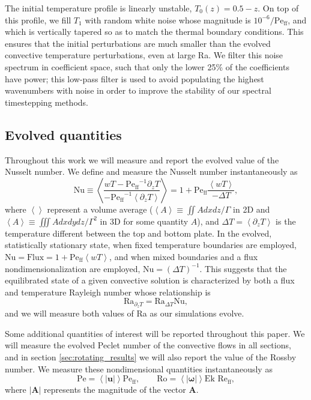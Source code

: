 \documentclass[aps, pre, onecolumn, nofootinbib, notitlepage, groupedaddress, amsfonts, amssymb, amsmath, longbibliography]{revtex4-1}
\newcommand{\angles}[1]{\ensuremath{\left\langle #1 \right\rangle}}
\newcommand{\Reff}{\ensuremath{\text{Re}_{\text{ff}}}}
\newcommand{\Peff}{\ensuremath{\text{Pe}_{\text{ff}}}}
\begin{document}
The initial temperature profile is linearly unstable, $T_0(z) = 0.5 - z$. 
On top of this profile, we fill $T_1$ with random white noise whose magnitude is $10^{-6}/\Peff$, and which is vertically tapered so as to match the thermal boundary conditions.
This ensures that the initial perturbations are much smaller than the evolved convective temperature perturbations, even at large Ra.
We filter this noise spectrum in coefficient space, 
such that only the lower 25\% of the coefficients
have power; this low-pass filter is used to avoid populating the
highest wavenumbers with noise in order to improve the stability of our
spectral timestepping methods.


\subsection{Evolved quantities}
\label{sec:ra_nu_relations}
Throughout this work we will measure and report the evolved value of the Nusselt number.
We define and measure the Nusselt number instantaneously as
\begin{equation}
\text{Nu} \equiv \angles{\frac{w T - \Peff^{-1} \partial_z T}{-\Peff^{-1} \angles{\partial_z T}}}
= 1 + \Peff\frac{\angles{w T}}{-\Delta T},
\end{equation}
where $\angles{}$ represent a volume average ($\angles{A} \equiv \iint A dx dz / \Gamma$ in 2D and $\angles{A} \equiv \iiint A dx dy dz / \Gamma^2$ in 3D for some quantity $A$), and $\Delta T = \angles{\partial_z T}$ is the temperature different between the top and bottom plate.
In the evolved, statistically stationary state, when fixed temperature boundaries are employed, $\text{Nu} = \text{Flux} = 1 + \Peff\angles{wT}$, and when mixed boundaries and a flux nondimensionalization are employed, $\text{Nu} = (\Delta T)^{-1}$.
This suggests that the equilibrated state of a given convective solution is characterized by both a flux and temperature Rayleigh number whose relationship is
\begin{equation}
\text{Ra}_{\partial_z T} = \text{Ra}_{\Delta T} \text{Nu},
\end{equation}
and we will measure both values of Ra as our simulations evolve.

Some additional quantities of interest will be reported throughout this paper.
We will measure the evolved Peclet number of the convective flows in all sections, and in section \ref{sec:rotating_results} we will also report the value of the Rossby number.
We measure these nondimensional quantities instantaneously as
\begin{equation}
\text{Pe} = \angles{|\bm{u}|}\Peff,\qquad \text{Ro} = \angles{|\bm{\omega}|}\text{Ek }\Reff,
\end{equation}
where $|\bm{A}|$ represents the magnitude of the vector $\bm{A}$.
\end{document}
